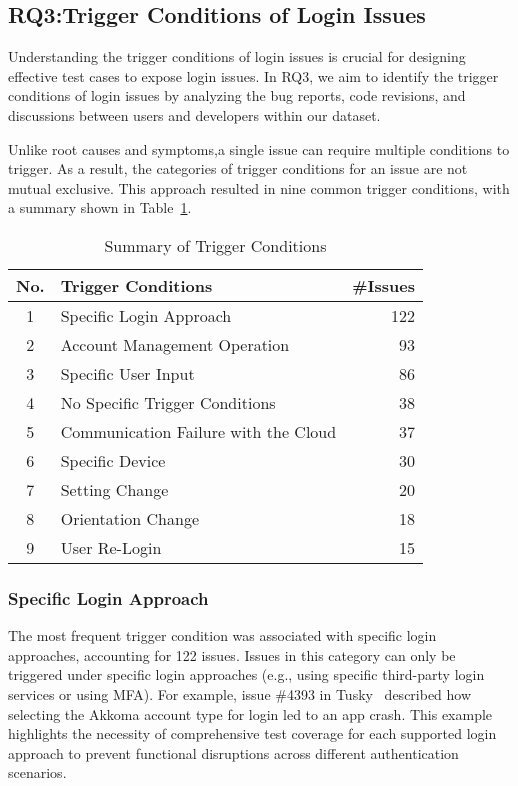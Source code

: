 \subsection{RQ3:Trigger Conditions of Login Issues}

Understanding the trigger conditions of login issues is crucial for designing effective test cases to expose login issues. In RQ3, we aim to identify the trigger conditions of login issues by analyzing the bug reports, code revisions, and discussions between users and developers within our dataset.

Unlike root causes and symptoms,a single issue can require multiple conditions to trigger.
As a result, the categories of trigger conditions for an issue are not mutual exclusive.
This approach resulted in nine common trigger conditions, with a summary shown in Table~\ref{tab:trigger-conditions}.

\begin{table}
  \centering
  \caption{Summary of Trigger Conditions}
  \label{tab:trigger-conditions}
  \begin{tabular}{@{}c l r@{}} %
    \toprule
    \textbf{No.} & \textbf{Trigger Conditions} & \textbf{\#Issues} \\ 
    \midrule
    1 & Specific Login Approach & 122 \\
    2 & Account Management Operation & 93 \\
    3 & Specific User Input & 86 \\
    4 & No Specific Trigger Conditions & 38 \\
    5 & Communication Failure with the Cloud & 37 \\
    6 & Specific Device & 30 \\
    7 & Setting Change & 20 \\
    8 & Orientation Change & 18 \\
    9 & User Re-Login & 15 \\
    
    \bottomrule
  \end{tabular}
\end{table}


\subsubsection{Specific Login Approach}
The most frequent trigger condition was associated with specific login approaches, accounting for 122 issues.
Issues in this category can only be triggered under specific login approaches (e.g., using specific third-party login services or using MFA).
For example, issue \#4393 in Tusky~\cite{tusky} described how selecting the Akkoma account type for login led to an app crash. This example highlights the necessity of comprehensive test coverage for each supported login approach to prevent functional disruptions across different authentication scenarios.


